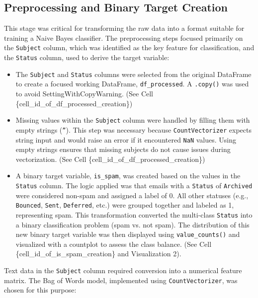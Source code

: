\documentclass[12pt,letterpaper]{article}
\begin{document}
\subsection{Preprocessing and Binary Target Creation}

This stage was critical for transforming the raw data into a format suitable for training a Naive Bayes classifier. The preprocessing steps focused primarily on the \texttt{Subject} column, which was identified as the key feature for classification, and the \texttt{Status} column, used to derive the target variable:

\begin{itemize}
    \item The \texttt{Subject} and \texttt{Status} columns were selected from the original DataFrame to create a focused working DataFrame, \texttt{df\_processed}. A \texttt{.copy()} was used to avoid SettingWithCopyWarning. (See Cell \{cell\_id\_of\_df\_processed\_creation\})
    
    \item Missing values within the \texttt{Subject} column were handled by filling them with empty strings (\texttt{''}). This step was necessary because \texttt{CountVectorizer} expects string input and would raise an error if it encountered \texttt{NaN} values. Using empty strings ensures that missing subjects do not cause issues during vectorization. (See Cell \{cell\_id\_of\_df\_processed\_creation\})
    
    \item A binary target variable, \texttt{is\_spam}, was created based on the values in the \texttt{Status} column. The logic applied was that emails with a \texttt{Status} of \texttt{Archived} were considered non-spam and assigned a label of 0. All other statuses (e.g., \texttt{Bounced}, \texttt{Sent}, \texttt{Deferred}, etc.) were grouped together and labeled as 1, representing spam. This transformation converted the multi-class \texttt{Status} into a binary classification problem (spam vs. not spam). The distribution of this new binary target variable was then displayed using \texttt{value\_counts()} and visualized with a countplot to assess the class balance. (See Cell \{cell\_id\_of\_is\_spam\_creation\} and Visualization 2).
\end{itemize}

Text data in the \texttt{Subject} column required conversion into a numerical feature matrix. The Bag of Words model, implemented using \texttt{CountVectorizer}, was chosen for this purpose:
\end{document}
